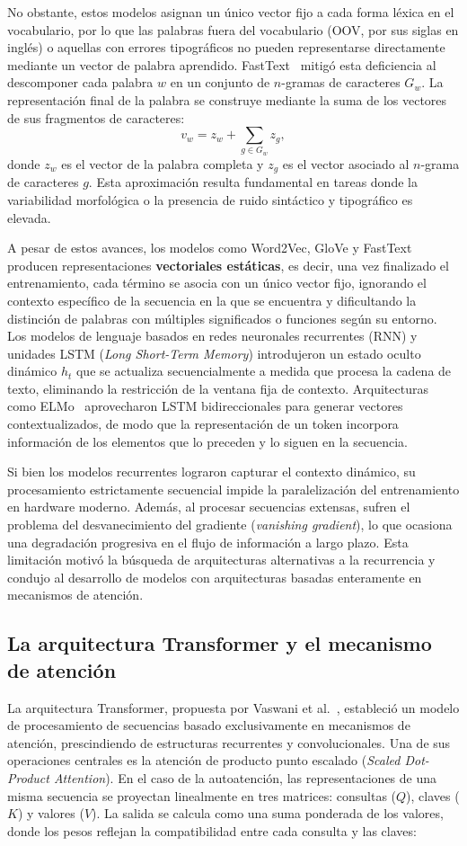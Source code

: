 No obstante, estos modelos asignan un único vector fijo a cada forma léxica en el vocabulario, por lo que las palabras fuera del vocabulario (OOV, por sus siglas en inglés) o aquellas con errores tipográficos no pueden representarse directamente mediante un vector de palabra aprendido. FastText~\cite{bojanowski2017} mitigó esta deficiencia al descomponer cada palabra $w$ en un conjunto de $n$-gramas de caracteres $G_w$. La representación final de la palabra se construye mediante la suma de los vectores de sus fragmentos de caracteres:
\[
v_w = z_w + \sum_{g \in G_w} z_g,
\]
donde $z_w$ es el vector de la palabra completa y $z_g$ es el vector
asociado al $n$-grama de caracteres $g$. Esta aproximación resulta fundamental en tareas donde la variabilidad morfológica o la presencia de ruido sintáctico y tipográfico es elevada.


A pesar de estos avances, los modelos como Word2Vec, GloVe y FastText producen representaciones \textbf{vectoriales estáticas}, es decir, una vez finalizado el entrenamiento, cada término se asocia con un único vector fijo, ignorando el contexto específico de la secuencia en la que se encuentra y dificultando la distinción de palabras con múltiples significados o funciones según su entorno.
Los modelos de lenguaje basados en redes neuronales recurrentes (RNN) y unidades LSTM (\textit{Long Short-Term Memory}) introdujeron un estado oculto dinámico $h_t$ que se actualiza secuencialmente a medida que procesa la cadena de texto, eliminando la restricción de la ventana fija de contexto. Arquitecturas como ELMo~\cite{peters2018} aprovecharon LSTM bidireccionales para generar vectores contextualizados, de modo que la representación de un token incorpora información de los elementos que lo preceden y lo siguen en la secuencia.

Si bien los modelos recurrentes lograron capturar el contexto dinámico, su procesamiento estrictamente secuencial impide la paralelización del entrenamiento en hardware moderno. Además, al procesar secuencias extensas, sufren el problema del desvanecimiento del gradiente (\textit{vanishing gradient}), lo que ocasiona una degradación progresiva en el flujo de información a largo plazo. Esta limitación motivó la búsqueda de arquitecturas alternativas a la recurrencia y condujo al desarrollo de modelos con arquitecturas basadas enteramente en mecanismos de atención.

\subsection{La arquitectura Transformer y el mecanismo de atención}
La arquitectura Transformer, propuesta por Vaswani et al.~\cite{vaswani2017}, estableció un modelo de procesamiento de secuencias basado exclusivamente en mecanismos de atención, prescindiendo de estructuras recurrentes y convolucionales. Una de sus operaciones centrales es la atención de producto punto escalado (\textit{Scaled Dot-Product Attention}). En el caso de la autoatención, las representaciones de una misma secuencia se proyectan linealmente en tres matrices: consultas ($Q$), claves ($K$) y valores ($V$). La salida se calcula como una suma ponderada de los valores, donde los pesos reflejan la compatibilidad entre cada consulta y las claves:

